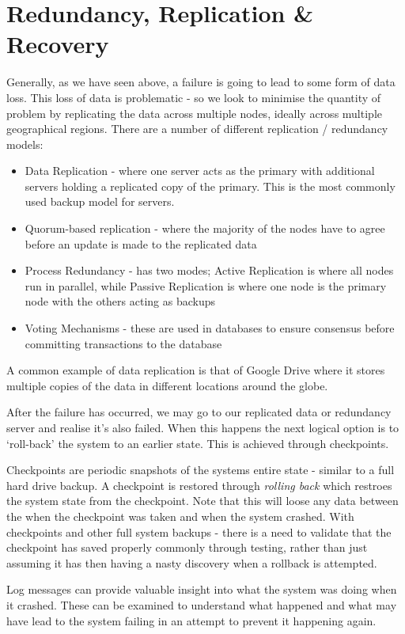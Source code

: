 \section{Redundancy, Replication \& Recovery}
Generally, as we have seen above, a failure is going to lead to some form of data loss. This loss of data is problematic - so we look to minimise the quantity of problem by replicating the data across multiple nodes, ideally across multiple geographical regions. There are a number of different replication / redundancy models:
\begin{itemize}
    \item Data Replication - where one server acts as the primary with additional servers holding a replicated copy of the primary. This is the most commonly used backup model for servers.
    \item Quorum-based replication - where the majority of the nodes have to agree before an update is made to the replicated data
    \item Process Redundancy - has two modes; Active Replication is where all nodes run in parallel, while Passive Replication is where one node is the primary node with the others acting as backups
    \item Voting Mechanisms - these are used in databases to ensure consensus before committing transactions to the database
\end{itemize}

A common example of data replication is that of Google Drive where it stores multiple copies of the data in different locations around the globe. 

After the failure has occurred, we may go to our replicated data or redundancy server and realise it's also failed. When this happens the next logical option is to `roll-back' the system to an earlier state. This is achieved through checkpoints. 

Checkpoints are periodic snapshots of the systems entire state - similar to a full hard drive backup. A checkpoint is restored through \textit{rolling back} which restroes the system state from the checkpoint. Note that this will loose any data between the when the checkpoint was taken and when the system crashed. With checkpoints and other full system backups - there is a need to validate that the checkpoint has saved properly commonly through testing, rather than just assuming it has then having a nasty discovery when a rollback is attempted. 

Log messages can provide valuable insight into what the system was doing when it crashed. These can be examined to understand what happened and what may have lead to the system failing in an attempt to prevent it happening again.

